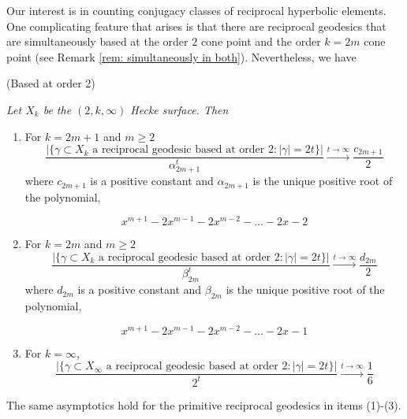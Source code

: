 \documentclass[11pt]{amsart}
\numberwithin{equation}{section}
\theoremstyle{plain}
\newtheorem{thm}{Theorem}[section]
\begin{document}
Our interest is in counting conjugacy classes of reciprocal  hyperbolic elements. One complicating feature that arises   is that there are reciprocal geodesics that are simultaneously based at the order 2 cone point and the order 
$k=2m$ cone point (see Remark \ref{rem: simultaneously in both}).  Nevertheless, we have


\vskip5pt

 (Based at order 2)
{\it Let $X_{k}$ be the $(2,k,\infty)$ Hecke surface. Then
\begin{enumerate}

\item  For $k=2m+1$ and $m \geq 2$
\begin{displaymath}
\frac{\big|\{\gamma \subset X_{k} \text{ a reciprocal geodesic  based at order 2}: |\gamma|=2t\}\big|}
{\alpha_{2m+1}^{t}} \xrightarrow{t\to\infty} \frac{c_{2m+1}}{2}
\end{displaymath}
where $c_{2m+1}$ is a positive constant and $\alpha_{2m+1}$ is the unique positive root of the polynomial,

\begin{equation*}
x^{m+1} -2x^{m-1}-2x^{m-2} - \dots -2x-2
\end{equation*}



\item For $k=2m$ and $m \geq 2$
\begin{displaymath}
\frac{\big|\{\gamma \subset X_{k} \text{ a reciprocal geodesic based at order 2}: |\gamma|=2t\}\big|}
{\beta_{2m}^{t}} \xrightarrow{t\to\infty} \frac{d_{2m}}{2}
\end{displaymath}
where $d_{2m}$ is a positive constant and $\beta_{2m}$ is the unique positive root of the polynomial,

\begin{equation*}
 x^{m+1} -2x^{m-1} -2x^{m-2}- \dots -2x-1 
\end{equation*}

\item For $k=\infty$, 
\begin{displaymath}
\frac{\big|\{\gamma \subset X_{\infty} \text{ a reciprocal geodesic  based at order 2} : |\gamma|=2t\}\big|}
{2^{t}} \xrightarrow{t\to\infty} \frac{1}{6}
\end{displaymath}
\end{enumerate}
The same asymptotics hold for the primitive reciprocal geodesics in items (1)-(3).}
\end{document}
